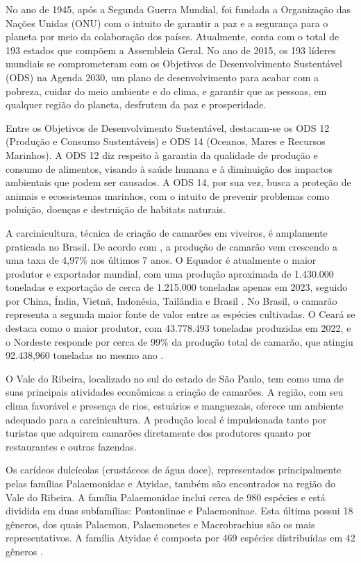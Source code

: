 No ano de 1945, após a Segunda Guerra Mundial, foi fundada a Organização das Nações Unidas (ONU) com o intuito de garantir a paz e a segurança para o planeta por meio da colaboração dos países. Atualmente, conta com o total de 193 estados que compõem a Assembleia Geral. No ano de 2015, os 193 líderes mundiais se comprometeram com os Objetivos de Desenvolvimento Sustentável (ODS) \cite{ODS12}na Agenda 2030, um plano de desenvolvimento para acabar com a pobreza, cuidar do meio ambiente e do clima, e garantir que as pessoas, em qualquer região do planeta, desfrutem da paz e prosperidade. 

Entre os Objetivos de Desenvolvimento Sustentável, destacam-se os ODS 12 (Produção e Consumo Sustentáveis) e ODS 14 (Oceanos, Mares e Recursos Marinhos). A ODS 12 diz respeito à garantia da qualidade de produção e consumo de alimentos, visando à saúde humana e à diminuição dos impactos ambientais que podem ser causados. A ODS 14, por sua vez, busca a proteção de animais e ecossistemas marinhos, com o intuito de prevenir problemas como poluição, doenças e destruição de habitats naturais.

A carcinicultura, técnica de criação de camarões em viveiros, é amplamente praticada no Brasil. De acordo com \cite{Rocha2023}, a produção de camarão vem crescendo a uma taxa de 4,97\% nos últimos 7 anos. O Equador é atualmente o maior produtor e exportador mundial, com uma produção aproximada de 1.430.000 toneladas e exportação de cerca de 1.215.000 toneladas apenas em 2023, seguido por China, Índia, Vietnã, Indonésia, Tailândia e Brasil \cite{Rocha2024}. No Brasil, o camarão representa a segunda maior fonte de valor entre as espécies cultivadas. O Ceará se destaca como o maior produtor, com 43.778.493 toneladas produzidas em 2022, e o Nordeste responde por cerca de 99\% da produção total de camarão, que atingiu 92.438,960 toneladas no mesmo ano \cite{Ximenes2023}.

O Vale do Ribeira, localizado no sul do estado de São Paulo, tem como uma de suas principais atividades econômicas a criação de camarões. A região, com seu clima favorável e presença de rios, estuários e manguezais, oferece um ambiente adequado para a carcinicultura. A produção local é impulsionada tanto por turistas que adquirem camarões diretamente dos produtores quanto por restaurantes e outras fazendas.

Os carídeos dulcícolas (crustáceos de água doce), representados principalmente pelas famílias Palaemonidae e Atyidae, também são encontrados na região do Vale do Ribeira. A família Palaemonidae inclui cerca de 980 espécies e está dividida em duas subfamílias: Pontoniinae e Palaemoninae. Esta última possui 18 gêneros, dos quais Palaemon, Palaemonetes e Macrobrachius são os mais representativos. A família Atyidae é composta por 469 espécies distribuídas em 42 gêneros \cite{bertini2021}.

